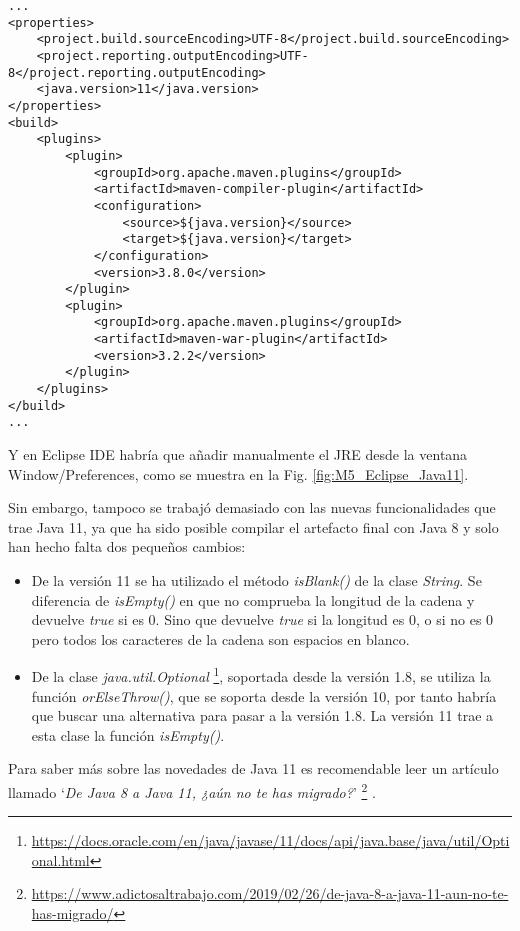 {\tiny
\begin{lstlisting}
...
<properties>
	<project.build.sourceEncoding>UTF-8</project.build.sourceEncoding>
	<project.reporting.outputEncoding>UTF-8</project.reporting.outputEncoding>
	<java.version>11</java.version>
</properties>
<build>
	<plugins>
		<plugin>
			<groupId>org.apache.maven.plugins</groupId>
			<artifactId>maven-compiler-plugin</artifactId>
			<configuration>
				<source>${java.version}</source>
				<target>${java.version}</target>
			</configuration>
			<version>3.8.0</version>
		</plugin>
		<plugin>
			<groupId>org.apache.maven.plugins</groupId>
			<artifactId>maven-war-plugin</artifactId>
			<version>3.2.2</version>
		</plugin>
	</plugins>
</build>
...
\end{lstlisting}
}

Y en Eclipse IDE habría que añadir manualmente el JRE desde la ventana Window/Preferences, como se muestra en la Fig. \ref{fig:M5_Eclipse_Java11}.

Sin embargo, tampoco se trabajó demasiado con las nuevas funcionalidades que trae Java 11, ya que ha sido posible compilar el artefacto final con Java 8 y solo han hecho falta dos pequeños cambios:
\begin{itemize}
	\item De la versión 11 se ha utilizado el método \textit{isBlank()} de la clase \textit{String}. Se diferencia de \textit{isEmpty()} en que no comprueba la longitud de la cadena y devuelve \textit{true} si es 0. Sino que devuelve \textit{true} si la longitud es 0, o si no es 0 pero todos los caracteres de la cadena son espacios en blanco.
	\item De la clase \textit{java.util.Optional} \footnote{\url{https://docs.oracle.com/en/java/javase/11/docs/api/java.base/java/util/Optional.html}}, soportada desde la versión 1.8, se utiliza la función \textit{orElseThrow()}, que se soporta desde la versión 10, por tanto habría que buscar una alternativa para pasar a la versión 1.8. La versión 11 trae a esta clase la función \textit{isEmpty()}.
\end{itemize}

Para saber más sobre las novedades de Java 11 es recomendable leer un artículo llamado `\textit{De Java 8 a Java 11, ¿aún no te has migrado?}' \footnote{\url{https://www.adictosaltrabajo.com/2019/02/26/de-java-8-a-java-11-aun-no-te-has-migrado/}} \cite{hoyo_java_2019}.

